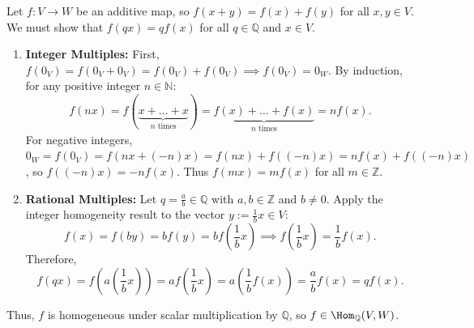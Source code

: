 \begin{exercisesolution}
\label{sol:additive_maps_over_rationals}
Let $f \colon V \to W$ be an additive map, so $f(x + y) = f(x) + f(y)$ for all $x, y \in V$. We must show that $f(q x) = q f(x)$ for all $q \in \mathbb{Q}$ and $x \in V$.

\begin{enumerate}[label=\textbf{(\alph*)}]
    \item \textbf{Integer Multiples:}
    First, $f(0_V) = f(0_V + 0_V) = f(0_V) + f(0_V) \implies f(0_V) = 0_W$.
    By induction, for any positive integer $n \in \mathbb{N}$:
    \[
    f(n x) = f(\underbrace{x + \dots + x}_{n \text{ times}}) = \underbrace{f(x) + \dots + f(x)}_{n \text{ times}} = n f(x).
    \]
    For negative integers, $0_W = f(0_V) = f(n x + (-n)x) = f(n x) + f((-n)x) = n f(x) + f((-n)x)$, so $f((-n)x) = -n f(x)$.
    Thus $f(m x) = m f(x)$ for all $m \in \mathbb{Z}$.

    \item \textbf{Rational Multiples:}
    Let $q = \frac{a}{b} \in \mathbb{Q}$ with $a, b \in \mathbb{Z}$ and $b \ne 0$.
    Apply the integer homogeneity result to the vector $y := \frac{1}{b} x \in V$:
    \[
    f(x) = f(b y) = b f(y) = b f\left(\frac{1}{b} x\right) \implies f\left(\frac{1}{b} x\right) = \frac{1}{b} f(x).
    \]
    Therefore,
    \[
    f(q x) = f\left(a \left(\frac{1}{b} x\right)\right) = a f\left(\frac{1}{b} x\right) = a \left(\frac{1}{b} f(x)\right) = \frac{a}{b} f(x) = q f(x).
    \]
\end{enumerate}
Thus, $f$ is homogeneous under scalar multiplication by $\mathbb{Q}$, so $f \in \Hom_{\mathbb{Q}}(V, W)$.
\end{exercisesolution}

